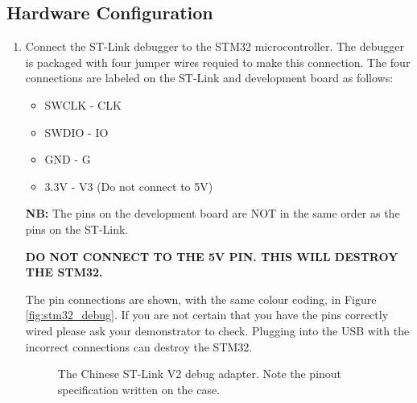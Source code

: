 \documentclass{UoNMCHA}
\numberwithin{equation}{section}
\begin{document}
\subsection{Hardware Configuration}
\begin{enumerate}
    \item Connect the ST-Link debugger to the STM32 microcontroller. The debugger is packaged with four jumper wires requied to make this connection. The four connections are labeled on the ST-Link and development board as follows:
    \begin{itemize}
        \item SWCLK - CLK
        \item SWDIO - IO
        \item GND - G
        \item 3.3V - V3 (Do not connect to 5V)
    \end{itemize}
    
    \textbf{NB:} The pins on the development board are NOT in the same order as the pins on the ST-Link.
    
    \textbf{DO NOT CONNECT TO THE 5V PIN. THIS WILL DESTROY THE STM32.}
    
    The pin connections are shown, with the same colour coding, in Figure \ref{fig:stm32_debug}.
    If you are not certain that you have the pins correctly wired please ask your demonstrator to check. Plugging into the USB with the incorrect connections    can destroy the STM32.

    \begin{figure}[H]
    \caption{The Chinese ST-Link V2 debug adapter. Note the pinout specification written on the case.}
    \label{fig:stlinktop}
    \end{figure}
    

\end{enumerate}
\end{document}
